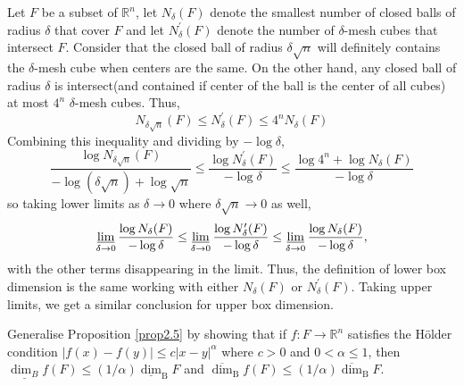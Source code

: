 \begin{customsol}{2.1}
    Let $F$ be a subset of $\mathbb{R}^{n}$, let $N_{\delta}(F)$ denote the smallest number of closed balls of radius $\delta$ that cover $F$ and let $N_{\delta}^{\prime}(F)$ denote the number of $\delta$-mesh cubes that intersect $F$. 
    Consider that the closed ball of radius $\delta\sqrt{n}$ will definitely contains the $\delta$-mesh cube when centers are the same. On the other hand, any closed ball of radius $\delta$ is intersect(and contained if center of the ball is the center of all cubes) at most $4^n$ $\delta$-mesh cubes. Thus, 
    $$
    N_{\delta \sqrt{n}}(F) \leq N_{\delta}^{\prime}(F) \leq 4^{n} N_{\delta}(F)
    $$
    Combining this inequality and dividing by $-\log \delta$,
$$
\frac{\log N_{\delta \sqrt{n}}(F)}{-\log (\delta \sqrt{n})+\log \sqrt{n}} \leq \frac{\log N_{\delta}^{\prime}(F)}{-\log \delta} \leq \frac{\log 4^{n}+\log N_{\delta}(F)}{-\log \delta}
$$
so taking lower limits as $\delta \rightarrow 0$ where $\delta\sqrt{n}\rightarrow 0 $ as well,
$$
\operatorname*{\underline{lim}} _{\delta \rightarrow 0} \frac{\log N_{\delta}(F)}{-\log \delta} \leq \operatorname*{\underline{lim}} _{\delta \rightarrow 0} \frac{\log N_{\delta}^{\prime}(F)}{-\log \delta} \leq \operatorname*{\underline{lim}} _{\delta \rightarrow 0} \frac{\log N_{\delta}(F)}{-\log \delta},
$$
with the other terms disappearing in the limit. Thus, the definition of lower box dimension is the same working with either $N_{\delta}(F)$ or $N_{\delta}^{\prime}(F)$. Taking upper limits, we get a similar conclusion for upper box dimension.
\end{customsol}


\begin{customexercise}{2.2}
    Generalise Proposition \ref{prop2.5} by showing that if $f: F \rightarrow \mathbb{R}^{n}$ satisfies the Hölder condition $|f(x)-f(y)| \leq c|x-y|^{\alpha}$ where $c>0$ and $0<\alpha \leq 1$, then $\underline{\operatorname{dim}_{B}} f(F) \leq(1 / \alpha) \underline{\operatorname{dim}}_{\mathrm{B}} F$ and $\overline{\operatorname{dim}}_{\mathrm{B}} f(F) \leq(1 / \alpha) \overline{\operatorname{dim}}_{\mathrm{B}} F$.
\end{customexercise}

